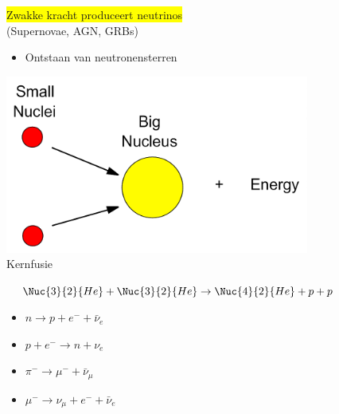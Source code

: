 \vspace{1cm}

\begin{center}
\colorbox{yellow}{Zwakke kracht produceert neutrinos}\\[2mm]
(Supernovae, AGN, GRBs)
\end{center}
%
\begin{itemize}
\item {\blue Ontstaan van neutronensterren}
\end{itemize}

\newpage
\begin{center}
\includegraphics[keepaspectratio,width=10cm]{nuclear-fusion}\\[2mm]
{\blue Kernfusie}
\end{center}
%
$\quad \Nuc{3}{2}{He}+\Nuc{3}{2}{He} \rightarrow \Nuc{4}{2}{He}+p+p$

\vspace{1cm}
\begin{itemize}
\item[] $n \rightarrow p+e^{-}+\bar{\nu}_{e}$
\item[] {\blue $p+e^{-} \rightarrow n+\nu_{e}$}
\item[] $\pi^{-} \rightarrow \mu^{-}+\bar{\nu}_{\mu}$
\item[] $\mu^{-} \rightarrow \nu_{\mu}+e^{-}+\bar{\nu}_{e}$
\end{itemize}

